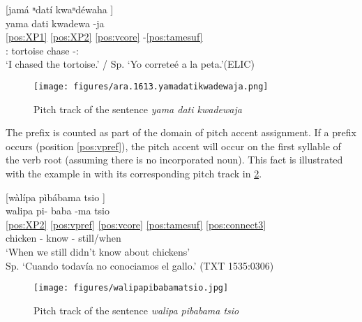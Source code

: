 \documentclass[output=paper,hidelinks]{langscibook}
\begin{document}
\ea \label{ex:kwade.LH}
		[jamá ⁿdatí kwaⁿdéwaha \downarrow] \\
	 \glll yama dati kwadewa -ja \\
	    \ref{pos:XP1} \ref{pos:XP2} \ref{pos:vcore}  -\ref{pos:tamesuf} \\
	    \Fsg{}:\Erg{} tortoise chase -\Recp{}:\Pst{} \\
	\glt `I chased the tortoise.' / Sp. `Yo correteé a la peta.'\hfill (ELIC)
\z


\begin{figure}
    \texttt{[image: figures/ara.1613.yamadatikwadewaja.png]}
    \caption{Pitch track of the sentence \textit{yama dati kwadewaja}}
    \label{fig:pitchtrackforyamadatikwadewaja}
\end{figure}

The prefix is counted as part of the domain of pitch accent assignment. If a prefix occurs (position \ref{pos:vpref}), the pitch accent will occur on the first syllable of the verb root (assuming there is no incorporated noun). This fact is illustrated with the example in  with its corresponding pitch track in \ref{fig:walipapibabamatsio}.

\newpage
\ea \label{ex:walipapibabamatsio}
	[wàlípa pìbábama tsio \uparrow\downarrow] \\	
	\glll walipa pi- baba -ma tsio \\
    \ref{pos:XP2} \ref{pos:vpref} \ref{pos:vcore} \ref{pos:tamesuf} \ref{pos:connect3}   \\
	chicken \Neg{}- know -\Neg{} still/when  \\
	\glt `When we still didn't know about chickens' \\ Sp. `Cuando todavía no conociamos el gallo.' \hfill (TXT 1535:0306)
\z

\begin{figure}
    \texttt{[image: figures/walipapibabamatsio.jpg]}
    \caption{Pitch track of the sentence \textit{walipa pibabama tsio}}
    \label{fig:walipapibabamatsio}
\end{figure}
\end{document}
